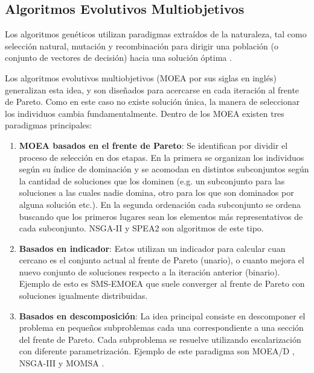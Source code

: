 \subsection{Algoritmos Evolutivos Multiobjetivos }

Los algoritmos gen\'eticos utilizan paradigmas extra\'idos de la naturaleza, tal como selecci\'on natural, mutaci\'on y recombinaci\'on para dirigir una poblaci\'on (o conjunto de vectores de decisi\'on) hacia una soluci\'on \'optima .

Los algoritmos evolutivos multiobjetivos (MOEA por sus siglas en ingl\'es) generalizan esta idea, y son diseñados para acercarse en cada iteraci\'on  al frente de Pareto. Como en este caso no existe soluci\'on \'unica, la manera de seleccionar los individuos cambia fundamentalmente. Dentro de los MOEA existen tres paradigmas principales:

\begin{enumerate}
    \item \textbf{MOEA basados en el frente de Pareto}\label{background:def:MOEA}: Se identifican por dividir el proceso de selecci\'on en dos etapas. En la primera se organizan los individuos seg\'un su \'indice de dominaci\'on y se acomodan en distintos subconjuntos seg\'un la cantidad de soluciones que los dominen (e.g. un subconjunto para las soluciones a las cuales nadie domina, otro para los que son dominados por alguna soluci\'on etc.). En la segunda ordenaci\'on cada subconjunto se ordena buscando que los primeros lugares sean los elementos m\'as representativos de cada subconjunto. NSGA-II  y SPEA2  son algoritmos de este tipo.

    \item \textbf{Basados en indicador}: Estos utilizan un indicador para calcular cuan cercano es el conjunto actual al frente de Pareto (unario), o cuanto mejora el nuevo conjunto de soluciones respecto a la iteraci\'on anterior (binario). Ejemplo de esto es SMS-EMOEA  que suele converger al frente de Pareto con soluciones igualmente distribuidas.

    \item \textbf{Basados en descomposici\'on}: La idea principal consiste en descomponer el problema en pequeños subproblemas cada una correspondiente a una secci\'on del frente de Pareto. Cada subproblema se resuelve utilizando escalarizaci\'on con diferente parametrizaci\'on. 
        Ejemplo de este paradigma son MOEA/D , NSGA-III  y MOMSA .

\end{enumerate}

